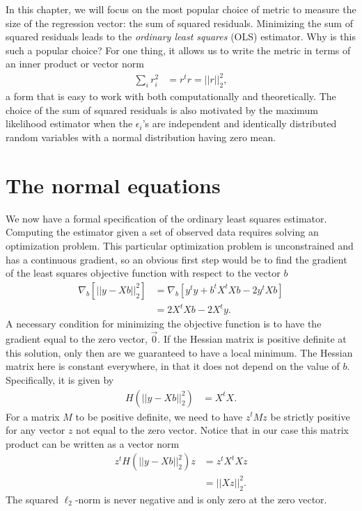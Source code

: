 \documentclass[12pt,hidelinks]{article}
\numberwithin{equation}{section}
\begin{document}
In this chapter, we will focus on the most popular choice of metric to
measure the size of the regression vector: the sum of squared residuals.
Minimizing the sum of squared residuals leads to the %
\textit{ordinary least squares} (OLS) estimator. Why is this such a
popular choice? For one thing, it allows us to write the metric in terms
of an inner product or vector norm
\begin{align}
\sum_i r_i^2 &= r^t r = || r ||_2^2,
\end{align}
a form that is easy to work with both computationally and theoretically.
The choice of the sum of squared residuals is also motivated by
the maximum likelihood estimator when the $\epsilon_i$'s are independent
and identically distributed random variables with a normal distribution
having zero mean.

\section{The normal equations}

We now have a formal specification of the ordinary least squares
estimator. Computing the estimator given a set of observed data
requires solving an optimization problem. This particular optimization
problem is unconstrained and has a continuous gradient, so an
obvious first step would be to find the gradient of the least
squares objective function with respect to the vector $b$
\begin{align}
\nabla_b \left[ || y - X b ||_2^2  \right] &= \nabla_b \left[ y^t y + b^t X^t X b - 2 y^t X b \right] \\
&= 2 X^t X b - 2 X^t y. \label{normalish_equations}
\end{align}
A necessary condition for minimizing the objective function is to have
the gradient equal to the zero vector, $\vec{0}$. If the Hessian matrix
is positive definite at this solution, only then are we guaranteed to have a
local minimum. The Hessian matrix here is constant everywhere, in
that it does not depend on the value of $b$. Specifically, it is
given by
\begin{align}
H\left( || y - X b ||_2^2  \right) &=  X^t X.
\end{align}
For a matrix $M$ to be positive definite, we need to have $z^t M z$ be
strictly positive for any vector $z$ not equal to the zero vector.
Notice that in our case this matrix product can be written as a
vector norm
\begin{align}
z^t H\left( || y - X b ||_2^2  \right) z &=  z^t X^t X z \\
&= || X z ||_2^2.
\end{align}
The squared $\ell_2$-norm is never negative and is only zero at the
zero vector.
\end{document}
